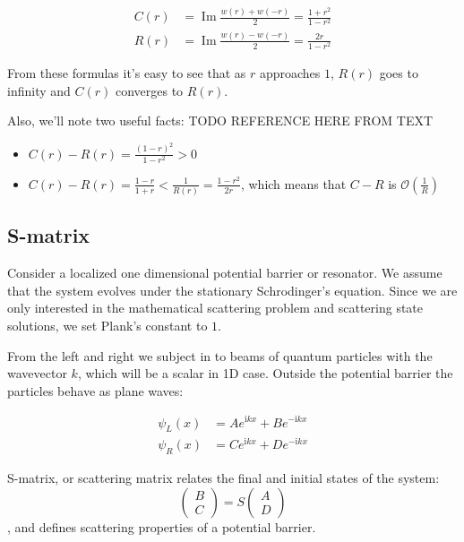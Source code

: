 \documentclass{gCOV2e}
\theoremstyle{plain}%
\theoremstyle{definition}
\theoremstyle{remark}
\begin{document}
\begin{equation}\label{eq:c_and_r}
\begin{aligned}
   C(r) &= \operatorname{Im} \frac{w(r) + w(-r)}{2} = \frac{1 + r^2}{1 - r^2}
\\ R(r) &= \operatorname{Im} \frac{w(r) - w(-r)}{2} = \frac{2 r}{1 - r^2}
\end{aligned}
\end{equation}

From these formulas it's easy to see that as $r$ approaches $1$, $R(r)$ goes to infinity and $C(r)$ converges to $R(r)$.

Also, we'll note two useful facts: TODO REFERENCE HERE FROM TEXT
\begin{itemize}
\item $C(r) - R(r) = \frac{(1 - r)^2}{1 - r^2} > 0$
\item $C(r) - R(r) = \frac{1 - r}{1 + r} < \frac{1}{R(r)} = \frac{1 - r^2}{2 r}$, which means that $C - R$ is $\mathcal{O}(\frac{1}{R})$
\end{itemize}

\subsection{S-matrix}\label{sec:smatrix}
Consider a localized one dimensional potential barrier or resonator. We assume that the system evolves under the stationary Schrodinger's equation. Since we are only interested in the mathematical scattering problem and scattering state solutions, we set Plank's constant to $1$.

From the left and right we subject in to beams of quantum particles with the wavevector $k$, which will be a scalar in 1D case. Outside the potential barrier the particles behave as plane waves:

\begin{equation}\label{eq:wlwl}
\begin{aligned}
   \psi_L(x) &= A e^{\mathrm{i} k x} + B e^{-\mathrm{i} k x}
\\ \psi_R(x) &= C e^{\mathrm{i} k x} + D e^{-\mathrm{i} k x}
\end{aligned}
\end{equation}

S-matrix, or scattering matrix relates the final and initial states of the system:
\begin{equation}\label{eq:smatrix}
\begin{pmatrix} B \\ C \end{pmatrix} = S \begin{pmatrix} A \\ D \end{pmatrix}
\end{equation}
, and defines scattering properties of a potential barrier.
\end{document}
